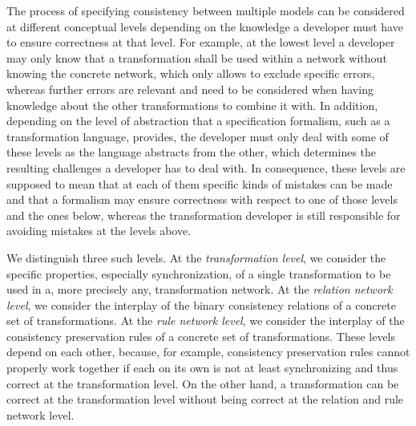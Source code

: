 The process of specifying consistency between multiple models can be considered at different conceptual levels depending on the knowledge a developer must have to ensure correctness at that level.
For example, at the lowest level a developer may only know that a transformation shall be used within a network without knowing the concrete network, which only allows to exclude specific errors, whereas further errors are relevant and need to be considered when having knowledge about the other transformations to combine it with.
In addition, depending on the level of abstraction that a specification formalism, such as a transformation language, provides, the developer must only deal with some of these levels as the language abstracts from the other, which determines the resulting challenges a developer has to deal with.
In consequence, these levels are supposed to mean that at each of them specific kinds of mistakes can be made and that a formalism may ensure correctness with respect to one of those levels and the ones below, whereas the transformation developer is still responsible for avoiding mistakes at the levels above.

We distinguish three such levels.
%
At the \emph{transformation level}, we consider the specific properties, especially synchronization, of a single transformation to be used in a, more precisely any, transformation network.
At the \emph{relation network level}, we consider the interplay of the binary consistency relations of a concrete set of transformations.
At the \emph{rule network level}, we consider the interplay of the consistency preservation rules of a concrete set of transformations.
These levels depend on each other, because, for example, consistency preservation rules cannot properly work together if each on its own is not at least synchronizing and thus correct at the transformation level.
On the other hand, a transformation can be correct at the transformation level without being correct at the relation and rule network level.

